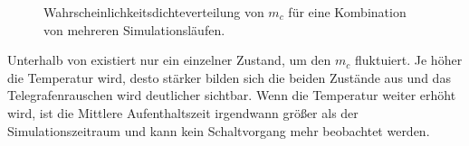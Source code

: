 \documentclass[main.tex]{subfiles}
\begin{document}
\begin{figure}[H]
    \centering
    \caption{Wahrscheinlichkeitsdichteverteilung von \(m_c\) für eine Kombination von mehreren Simulationsläufen.}\label{fig:temp-hist}    
\end{figure}

Unterhalb von  existiert nur ein einzelner Zustand, um den \(m_c\) fluktuiert. Je höher die Temperatur wird, desto stärker bilden sich die beiden Zustände aus und das Telegrafenrauschen wird deutlicher sichtbar. Wenn die Temperatur weiter erhöht wird, ist die Mittlere Aufenthaltszeit irgendwann größer als der Simulationszeitraum und kann kein Schaltvorgang mehr beobachtet werden.
\end{document}
